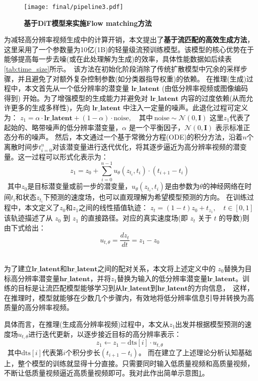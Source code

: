 \begin{figure}[htbp]
    \centering
    \texttt{[image: final/pipeline3.pdf]}
    \caption{\textbf{基于DiT模型来实施Flow matching方法}
    }
    \label{fig:Flow matching}
\end{figure}

为减轻高分辨率视频生成中的计算开销，本文提出了\textbf{基于流匹配的高效生成方法}，这里采用了一个参数量为10亿(1B)的轻量级流预训练模型。该模型的核心优势在于能够提高每一步去噪(或在此处理解为生成)的效率，具体性能数据如后续表\ref{tab:time_size}所示。\
该方法在初始化阶段消除了传统扩散模型中冗余的采样步骤，并且避免了对额外复杂控制参数(如分类器指导权重)的依赖。
在推理(生成)过程中，本文首先从一个低分辨率的潜变量 $\mathbf{lr\_latent}$ (由低分辨率视频或图像编码得到) 开始。为了增强模型的生成能力并避免对 $\mathbf{lr\_latent}$ 内容的过度依赖(从而允许更多的生成多样性)，先向 $\mathbf{lr\_latent}$ 中注入一定量的噪声。此退化过程可定义为：
$z_1 = \alpha \cdot \mathbf{lr\_latent} + (1 - \alpha) \cdot \text{noise}, \quad \text{其中} \ \text{noise} \sim \mathcal{N}(0, \mathbf{I})$
这里$z_1$代表了起始的、略带噪声的低分辨率潜变量，$\alpha$ 是一个平衡因子，$\mathcal{N}(0, \mathbf{I})$ 表示标准正态分布的噪声。
然后，本文通过一个基于常微分方程(ODE)的积分方法，沿着$n$个离散时间步$t_{i=0}^n$对该潜变量进行迭代优化，将其逐步逼近为高分辨率视频的潜变量。这一过程可以形式化表示为：
\[\
z_1 = z_0 + \sum_{i=0}^{n-1} u_\theta(z_{t_i}, t_i) \cdot (t_{i+1} - t_i)
\]\
其中$z_0$是目标潜变量或前一步的潜变量，$u_\theta(z_{t_i}, t_i)$是由参数为$\theta$的神经网络在时间$t_i$和状态$z_{t_i}$下预测的速度场，也可以直观理解为希望模型预测的方向。
在训练过程中，本文定义了$z_0$和$z_1$之间的线性插值轨迹：
$z_t = (1 - t) z_0 + t_{z_1}, \quad t \in [0,1]$
该轨迹描述了从 $z_0$ 到 $z_1$ 的直接路径。对应的真实速度场(即 $z_t$ 关于 $t$ 的导数)则由下式给出：\[\ 
u_{t,\theta} = \frac{dz_t}{dt} = z_1 - z_0
\]\

为了建立$\mathbf{lr\_latent}$和$\mathbf{hr\_latent}$之间的配对关系，本文将上述定义中的 $z_0$替换为目标高分辨率潜变量$\mathbf{hr\_latent}$，并将$z_1$替换为输入的低分辨率潜变量$\mathbf{lr\_latent}$。训练的目标是让流匹配模型能够学习到从$\mathbf{lr\_latent}$到$\mathbf{hr\_latent}$的方向信息，\
这样，在推理时，模型就能够在少数几个步骤内，有效地将低分辨率信息引导并转换为高质量的高分辨率视频。


具体而言，在推理(生成高分辨率视频)过程中，本文从$z_1$出发并根据模型预测的速度场$u_{t,\theta}$进行迭代更新，以逐步接近目标的高分辨率表示：
\[\ 
z_1 \leftarrow z_1 - \text{dts}[i] \cdot u_{t,\theta}
\]\, 其中$\text{dts}[i]$代表第$i$个积分步长$(t_{i+1} - t_{i})$。
而在建立了上述理论分析认知基础上，整个模型的训练就显得十分直接。只需要同时输入低质量视频和高质量视频，不断让低质量视频逼近高质量视频即可。我对此作出简单示意图\ref{fig:Flow matching}。


